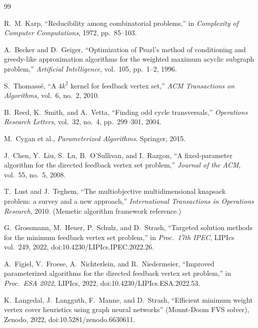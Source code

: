 \documentclass[10pt,a4paper]{report}
\theoremstyle{definition}
\begin{document}

\begin{thebibliography}{99}

	R.~M. Karp, ``Reducibility among combinatorial problems,''
	in \emph{Complexity of Computer Computations}, 1972, pp.~85--103.

	A.~Becker and D.~Geiger, ``Optimization of Pearl's method of conditioning and
	greedy-like approximation algorithms for the weighted maximum acyclic subgraph
	problem,'' \emph{Artificial Intelligence}, vol.~105, pp.~1--2, 1996.

	S.~Thomass{\'e}, ``A $4k^2$ kernel for feedback vertex set,''
	\emph{ACM Transactions on Algorithms}, vol.~6, no.~2, 2010.

	B.~Reed, K.~Smith, and A.~Vetta, ``Finding odd cycle transversals,''
	\emph{Operations Research Letters}, vol.~32, no.~4, pp.~299--301, 2004.

	M.~Cygan et al., \emph{Parameterized Algorithms}. Springer, 2015.

	J.~Chen, Y.~Liu, S.~Lu, B.~O'Sullivan, and I.~Razgon, ``A fixed-parameter
	algorithm for the directed feedback vertex set problem,''
	\emph{Journal of the ACM}, vol.~55, no.~5, 2008.

	T.~Lust and J.~Teghem, ``The multiobjective multidimensional knapsack problem:
	a survey and a new approach,'' \emph{International Transactions in Operations
		Research}, 2010. (Memetic algorithm framework reference.)

	G.~Grossmann, M.~Heuer, P.~Schulz, and D.~Strash,
	``Targeted solution methods for the minimum feedback vertex set problem,''
	in \emph{Proc.~17th IPEC}, LIPIcs vol.~249, 2022,
	doi:10.4230/LIPIcs.IPEC.2022.26.

	A.~Figiel, V.~Froese, A.~Nichterlein, and R.~Niedermeier,
	``Improved parameterized algorithms for the directed feedback vertex set
	problem,'' in \emph{Proc.~ESA 2022}, LIPIcs, 2022,
	doi:10.4230/LIPIcs.ESA.2022.53.

	K.~Langedal, J.~Langguth, F.~Manne, and D.~Strash,
	``Efficient minimum weight vertex cover heuristics using graph neural
	networks'' (Mount-Doom FVS solver), Zenodo, 2022,
	doi:10.5281/zenodo.6630611.


\end{thebibliography}
\end{document}

